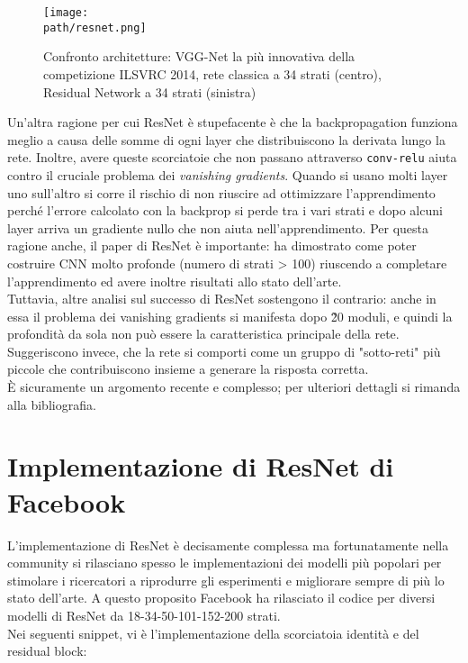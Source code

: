 \begin{figure}[h!]
 \centering
 \texttt{[image: \\path/resnet.png]} 
 \caption{Confronto architetture: VGG-Net la più innovativa della competizione ILSVRC 2014, rete classica a 34 strati (centro), Residual Network a 34 strati (sinistra)}
 \label{fig:resnet}
\end{figure}
\bigskip
Un'altra ragione per cui ResNet è stupefacente è che la backpropagation funziona meglio a causa delle somme di ogni layer che distribuiscono la derivata lungo la rete. Inoltre, avere queste scorciatoie che non passano attraverso \texttt{conv-relu} aiuta contro il cruciale problema dei \emph{vanishing gradients}. Quando si usano molti layer uno sull'altro si corre il rischio di non riuscire ad ottimizzare l'apprendimento perché l'errore calcolato con la backprop si perde tra i vari strati e dopo alcuni layer arriva un gradiente nullo che non aiuta nell'apprendimento. Per questa ragione anche, il paper di ResNet è importante: ha dimostrato come poter costruire CNN molto profonde (numero di strati > 100) riuscendo a completare l'apprendimento ed avere inoltre risultati allo stato dell'arte. \\
Tuttavia, altre analisi sul successo di ResNet \parencite{restudy} sostengono il contrario: anche in essa il problema dei vanishing gradients si manifesta dopo \~20 moduli, e quindi la profondità da sola non può essere la caratteristica principale della rete. Suggeriscono invece, che la rete si comporti come un gruppo di "sotto-reti" più piccole che contribuiscono insieme a generare la risposta corretta.\\
È sicuramente un argomento recente e complesso; per ulteriori dettagli si rimanda alla bibliografia. 
\section{Implementazione di ResNet di Facebook}
L'implementazione di ResNet è decisamente complessa ma fortunatamente nella community si rilasciano spesso le implementazioni dei modelli più popolari per stimolare i ricercatori a riprodurre gli esperimenti e migliorare sempre di più lo stato dell'arte. A questo proposito Facebook ha rilasciato il codice per diversi modelli di ResNet da 18-34-50-101-152-200 strati. \\
Nei seguenti snippet, vi è l'implementazione della scorciatoia identità e del residual block: 

